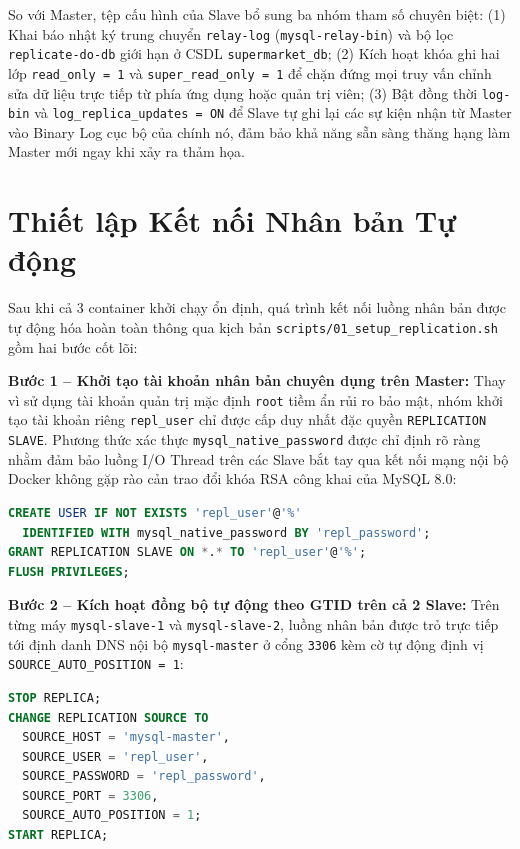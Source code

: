 \documentclass[12pt,a4paper]{report}
\begin{document}
So với Master, tệp cấu hình của Slave bổ sung ba nhóm tham số chuyên biệt: (1) Khai báo nhật ký trung chuyển \texttt{relay-log} (\texttt{mysql-relay-bin}) và bộ lọc \texttt{replicate-do-db} giới hạn ở CSDL \texttt{supermarket\_db}; (2) Kích hoạt khóa ghi hai lớp \texttt{read\_only = 1} và \texttt{super\_read\_only = 1} để chặn đứng mọi truy vấn chỉnh sửa dữ liệu trực tiếp từ phía ứng dụng hoặc quản trị viên; (3) Bật đồng thời \texttt{log-bin} và \texttt{log\_replica\_updates = ON} để Slave tự ghi lại các sự kiện nhận từ Master vào Binary Log cục bộ của chính nó, đảm bảo khả năng sẵn sàng thăng hạng làm Master mới ngay khi xảy ra thảm họa.

\section{Thiết lập Kết nối Nhân bản Tự động}
Sau khi cả 3 container khởi chạy ổn định, quá trình kết nối luồng nhân bản được tự động hóa hoàn toàn thông qua kịch bản \texttt{scripts/01\_setup\_replication.sh} gồm hai bước cốt lõi:

\textbf{Bước 1 -- Khởi tạo tài khoản nhân bản chuyên dụng trên Master:} Thay vì sử dụng tài khoản quản trị mặc định \texttt{root} tiềm ẩn rủi ro bảo mật, nhóm khởi tạo tài khoản riêng \texttt{repl\_user} chỉ được cấp duy nhất đặc quyền \texttt{REPLICATION SLAVE}. Phương thức xác thực \texttt{mysql\_native\_password} được chỉ định rõ ràng nhằm đảm bảo luồng I/O Thread trên các Slave bắt tay qua kết nối mạng nội bộ Docker không gặp rào cản trao đổi khóa RSA công khai của MySQL 8.0:

\begin{lstlisting}[language=SQL, caption={Khởi tạo và phân quyền tài khoản nhân bản trên Master}]
CREATE USER IF NOT EXISTS 'repl_user'@'%'
  IDENTIFIED WITH mysql_native_password BY 'repl_password';
GRANT REPLICATION SLAVE ON *.* TO 'repl_user'@'%';
FLUSH PRIVILEGES;
\end{lstlisting}

\textbf{Bước 2 -- Kích hoạt đồng bộ tự động theo GTID trên cả 2 Slave:} Trên từng máy \texttt{mysql-slave-1} và \texttt{mysql-slave-2}, luồng nhân bản được trỏ trực tiếp tới định danh DNS nội bộ \texttt{mysql-master} ở cổng \texttt{3306} kèm cờ tự động định vị \texttt{SOURCE\_AUTO\_POSITION = 1}:

\begin{lstlisting}[language=SQL, caption={Thiết lập nguồn nhân bản GTID trên Slave 1 và Slave 2}]
STOP REPLICA;
CHANGE REPLICATION SOURCE TO
  SOURCE_HOST = 'mysql-master',
  SOURCE_USER = 'repl_user',
  SOURCE_PASSWORD = 'repl_password',
  SOURCE_PORT = 3306,
  SOURCE_AUTO_POSITION = 1;
START REPLICA;
\end{lstlisting}
\end{document}
